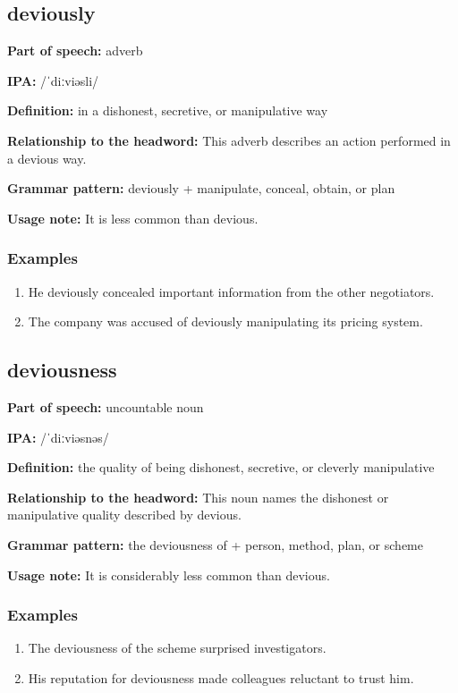\documentclass[11pt]{article}
\begin{document}
\subsection{deviously}
\textbf{Part of speech:} adverb

\textbf{IPA:} /ˈdiːviəsli/

\textbf{Definition:} in a dishonest, secretive, or manipulative way

\textbf{Relationship to the headword:} This adverb describes an action performed in a devious way.

\textbf{Grammar pattern:} deviously + manipulate, conceal, obtain, or plan

\textbf{Usage note:} It is less common than devious.

\subsubsection{Examples}
\begin{enumerate}
  \item He deviously concealed important information from the other negotiators.
  \item The company was accused of deviously manipulating its pricing system.
\end{enumerate}

\subsection{deviousness}
\textbf{Part of speech:} uncountable noun

\textbf{IPA:} /ˈdiːviəsnəs/

\textbf{Definition:} the quality of being dishonest, secretive, or cleverly manipulative

\textbf{Relationship to the headword:} This noun names the dishonest or manipulative quality described by devious.

\textbf{Grammar pattern:} the deviousness of + person, method, plan, or scheme

\textbf{Usage note:} It is considerably less common than devious.

\subsubsection{Examples}
\begin{enumerate}
  \item The deviousness of the scheme surprised investigators.
  \item His reputation for deviousness made colleagues reluctant to trust him.
\end{enumerate}
\end{document}
